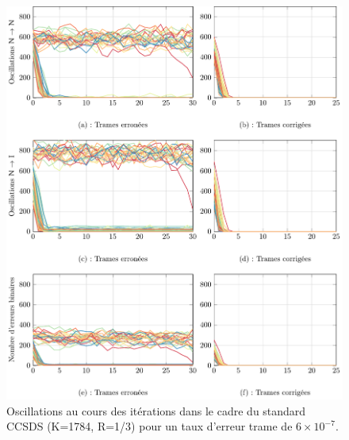 \begin{figure}[!ht]
	\begin{center}
	\includegraphics[width=\textwidth]{main/ch2_fig/tikz/it_ccsds610-7.pdf}
	\caption{Oscillations au cours des itérations dans le cadre du standard CCSDS (K=1784, R=1/3) pour un taux d'erreur trame de $6\times10^{-7}$.\label{fig:it2_ccsds}}
	\end{center}
\end{figure}

